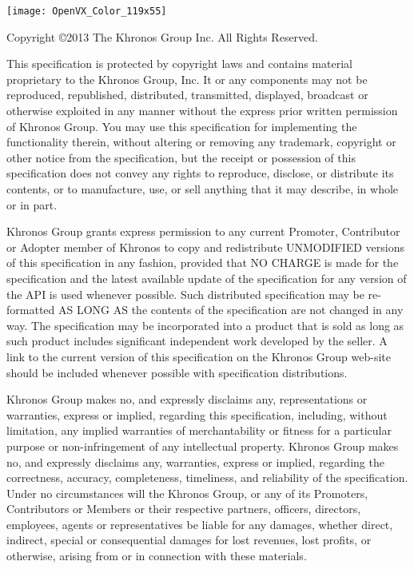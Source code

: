 \documentclass[oneside]{book}
\begin{document}
\begin{copyrightpage}
\vspace*{1cm}
\begin{center}
\texttt{[image: OpenVX\_Color\_119x55]}
\end{center}
Copyright \copyright 2013 The Khronos Group Inc. All Rights Reserved.

This specification is protected by copyright laws and contains material proprietary to the Khronos Group, Inc. It or any components may not be reproduced, republished, distributed, transmitted, displayed, broadcast or otherwise exploited in any manner without the express prior written permission of Khronos Group. You may use this specification for implementing the functionality therein, without altering or removing any trademark, copyright or other notice from the specification, but the receipt or possession of this specification does not convey any rights to reproduce, disclose, or distribute its contents, or to manufacture, use, or sell anything that it may describe, in whole or in part.

Khronos Group grants express permission to any current Promoter, Contributor or Adopter member of Khronos to copy and redistribute UNMODIFIED versions of this specification in any fashion, provided that NO CHARGE is made for the specification and the latest available update of the specification for any version of the API is used whenever possible.  Such distributed specification may be re-formatted AS LONG AS the contents of the specification are not changed in any way.  The specification may be incorporated into a product that is sold as long as such product includes significant independent work developed by the seller.   A link to the current version of this specification on the Khronos Group web-site should be included whenever possible with specification distributions.

Khronos Group makes no, and expressly disclaims any, representations or warranties, express or implied, regarding this specification, including, without limitation, any implied warranties of merchantability or fitness for a particular purpose or non-infringement of any intellectual property. Khronos Group makes no, and expressly disclaims any, warranties, express or implied, regarding the correctness, accuracy, completeness, timeliness, and reliability of the specification. Under no circumstances will the Khronos Group, or any of its Promoters, Contributors or Members or their respective partners, officers, directors, employees, agents or representatives be liable for any damages, whether direct, indirect, special or consequential damages for lost revenues, lost profits, or otherwise, arising from or in connection with these materials.


\end{copyrightpage}
\end{document}
